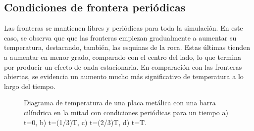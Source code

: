 \documentclass{article}
\begin{document}
\subsection*{Condiciones de frontera periódicas}
Las fronteras se mantienen libres y periódicas para toda la simulación. En este caso, se observa que que las fronteras empiezan gradualmente a aumentar su temperatura, destacando, también, las esquinas de la roca. Estas últimas tienden a aumentar en menor grado, comparado con el centro del lado, lo que termina por producir un efecto de onda estacionaria. En comparación con las fronteras abiertas, se evidencia un aumento mucho más significativo de temperatura a lo largo del tiempo.
\begin{figure}[H]
    \centering
    \caption{Diagrama de temperatura de una placa metálica con una barra cilíndrica en la mitad con condiciones periódicas para un tiempo a) t=0, b) t=(1/3)T, c) t=(2/3)T, d) t=T.}
    \label{fig:CondicionesFijasTemp}
\end{figure}
\end{document}
